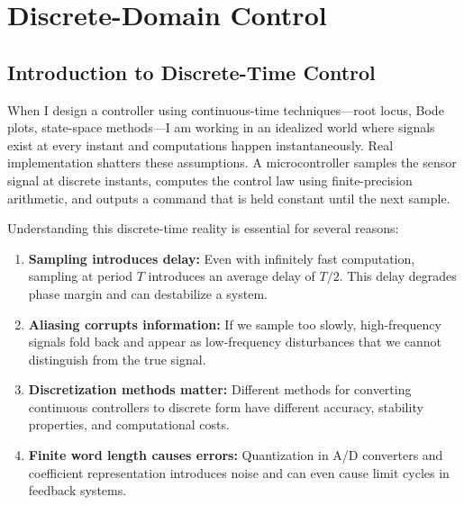 \chapter{Discrete-Domain Control}
\label{ch:discrete_control}


\section{Introduction to Discrete-Time Control}
\label{sec:discrete_intro}

When I design a controller using continuous-time techniques---root locus, Bode plots, state-space methods---I am working in an idealized world where signals exist at every instant and computations happen instantaneously. Real implementation shatters these assumptions. A microcontroller samples the sensor signal at discrete instants, computes the control law using finite-precision arithmetic, and outputs a command that is held constant until the next sample.

Understanding this discrete-time reality is essential for several reasons:

\begin{enumerate}
    \item \textbf{Sampling introduces delay:} Even with infinitely fast computation, sampling at period $T$ introduces an average delay of $T/2$. This delay degrades phase margin and can destabilize a system.

    \item \textbf{Aliasing corrupts information:} If we sample too slowly, high-frequency signals fold back and appear as low-frequency disturbances that we cannot distinguish from the true signal.

    \item \textbf{Discretization methods matter:} Different methods for converting continuous controllers to discrete form have different accuracy, stability properties, and computational costs.

    \item \textbf{Finite word length causes errors:} Quantization in A/D converters and coefficient representation introduces noise and can even cause limit cycles in feedback systems.
\end{enumerate}

